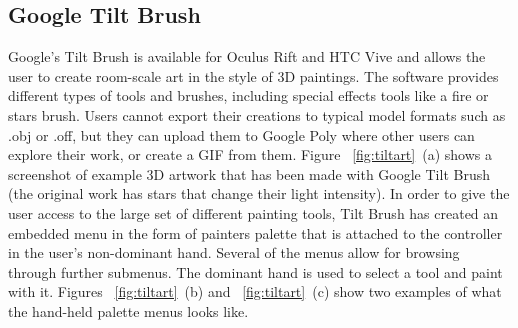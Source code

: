\subsection{Google Tilt Brush}
Google's Tilt Brush is available for Oculus Rift and HTC Vive and allows the user to  create room-scale art in the style of 3D paintings. The software provides different types of tools and brushes, including special effects tools like a fire or stars brush. Users cannot export their creations to typical model formats such as .obj or .off, but they can upload them to Google Poly where other users can explore their work, or create a GIF from them.
Figure ~\ref{fig:tiltart}~(a) shows a screenshot of example 3D artwork that has been made with Google Tilt Brush (the original work has stars that change their light intensity). In order to give the user access to the large set of different painting tools, Tilt Brush has created an embedded menu in the form of painters palette that is attached to the controller in the user's non-dominant hand. Several of the menus allow for browsing through further submenus. The dominant hand is used to select a tool and paint with it. Figures ~\ref{fig:tiltart}~(b) and ~\ref{fig:tiltart}~(c) show two examples of what the hand-held palette menus looks like.



